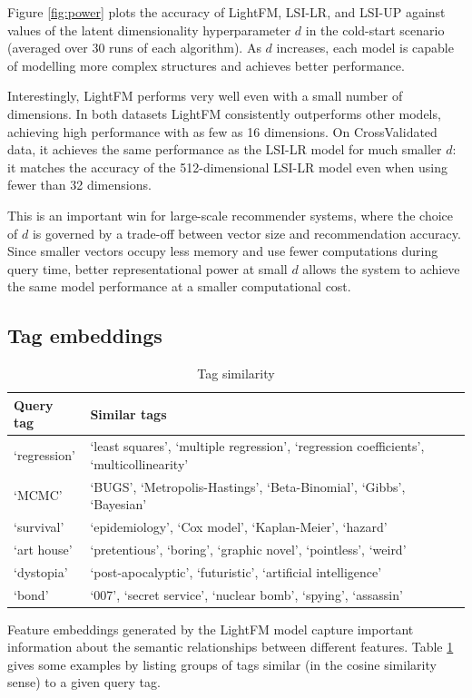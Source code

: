 \documentclass{sig-alternate}
\begin{document}
\label{sec:sensitivity}
Figure \ref{fig:power} plots the accuracy of LightFM, LSI-LR, and LSI-UP against values of the latent dimensionality hyperparameter $d$ in the cold-start scenario (averaged over 30 runs of each algorithm). As $d$ increases, each model is capable of modelling more complex structures and achieves better performance.

Interestingly, LightFM performs very well even with a small number of dimensions. In both datasets LightFM consistently outperforms other models, achieving high performance with as few as 16 dimensions. On CrossValidated data, it achieves the same performance as the LSI-LR model for much smaller $d$: it matches the accuracy of the 512-dimensional LSI-LR model even when using fewer than 32 dimensions.

This is an important win for large-scale recommender systems, where the choice of $d$ is governed by a trade-off between vector size and recommendation accuracy. Since smaller vectors occupy less memory and use fewer computations during query time, better representational power at small $d$ allows the system to achieve the same model performance at a smaller computational cost.

\subsection{Tag embeddings}
\begin{table}
\centering
\caption{Tag similarity}
\label{table:tags}
\begin{tabularx}{\columnwidth}{lX} \toprule
Query tag & Similar tags \\ \midrule
`regression' & `least squares', `multiple regression', `regression coefficients', `multicollinearity'\\
`MCMC' & `BUGS', `Metropolis-Hastings', `Beta-Binomial', `Gibbs', `Bayesian' \\
`survival' & `epidemiology', `Cox model', `Kaplan-Meier', `hazard' \\
`art house' & `pretentious', `boring', `graphic novel', `pointless', `weird' \\
`dystopia' & `post-apocalyptic', `futuristic', `artificial intelligence' \\
`bond' & `007', `secret service', `nuclear bomb', `spying', `assassin' \\
\bottomrule
\end{tabularx}
\end{table}

Feature embeddings generated by the LightFM model capture important information about the semantic relationships between different features. Table \ref{table:tags} gives some examples by listing groups of tags similar (in the cosine similarity sense) to a given query tag.
\end{document}
